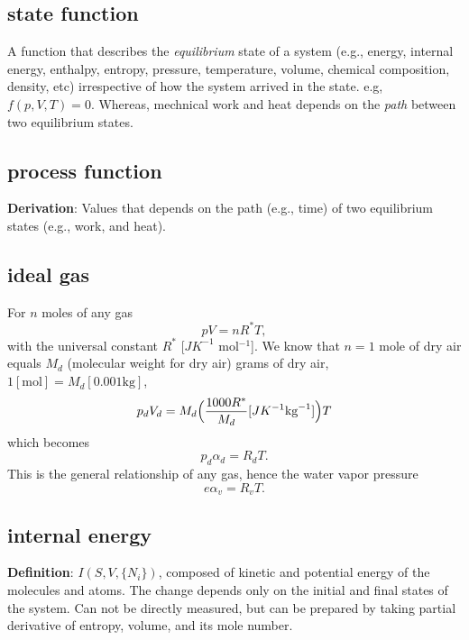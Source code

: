 \setlength\parindent{0pt} %

\subsection{state function}
A function that describes the \emph{equilibrium} state of a system (e.g., energy, internal energy,
enthalpy, entropy, pressure, temperature, volume, chemical composition, density, etc) irrespective
of how the system arrived in the state. e.g, $f(p,V,T)=0$. Whereas, mechnical work and heat depends
on the \emph{path} between two equilibrium states. \\

\subsection{process function}
{\bf{Derivation}}: Values that depends on the path (e.g., time) of two equilibrium states (e.g.,
work, and heat).

\subsection{ideal gas}
For $n$ moles of any gas
\begin{equation}
    pV = nR^*T,
\end{equation}
with the universal constant $R^*$ [$J K^{-1}$ mol$^{-1}$]. We know that $n=1$ mole of dry air equals
$M_d$ (molecular weight for dry air) grams of dry air, $1[\text{mol}] = M_d [0.001\text{kg}]$,
\begin{equation}
        p_d V_d  = M_d \Big(\frac{1000 R^*}{M_d} [ J K^{-1} \text{kg}^{-1}]\Big) T \\
\end{equation}
which becomes
\begin{equation} \label{eq:idealgas2}
    p_d \alpha_d = R_d T.
\end{equation}
This is the general relationship of any gas, hence the water vapor pressure 
\begin{equation} \label{eq:idealgas3}
   e \alpha_v = R_v T.
\end{equation}


\subsection{internal energy}
{\bf{Definition}}: $I(S,V,\{N_i\})$, composed of kinetic and potential energy of the molecules and
atoms. The change depends only on the initial and final states of the system. Can not be directly
measured, but can be prepared by taking partial derivative of entropy, volume, and its mole number.

